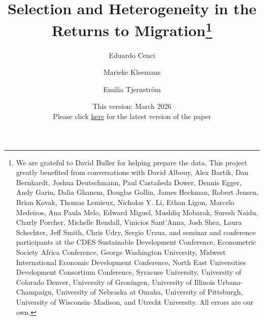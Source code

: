 \documentclass[12pt]{article}
\begin{document}
\hypersetup{pageanchor=false}
\begin{titlepage}

\title{Selection and Heterogeneity in the Returns to Migration\footnote{%
We are grateful to David Buller for helping prepare the data. This project greatly benefited from conversations with David Albouy, Alex Bartik, Dan Bernhardt, Joshua Deutschmann, Paul Castañeda Dower, Dennis Egger, Andy Garin, Dalia Ghanem, Douglas Gollin, James Heckman, Robert Jensen, Brian Kovak, Thomas Lemieux, Nicholas Y. Li, Ethan Ligon, Marcelo Medeiros, Ana Paula Melo, Edward Miguel, Mushfiq Mobarak, Suresh Naidu, Charly Porcher, Michelle Rendall, Vinicios Sant'Anna, Josh Shea, Laura Schechter, Jeff Smith, Chris Udry, Sergio Urzua, and seminar and conference participants at the CDES Sustainable Development Conference, Econometric Society Africa Conference, George Washington University, Midwest International Economic Development Conference, North East Universities Development Consortium Conference, Syracuse University, University of Colorado Denver, University of Groningen, University of Illinois Urbana-Champaign, University of Nebraska at Omaha, University of Pittsburgh, University of Wisconsin–Madison, and Utrecht University. All errors are our own.}}
\author{
  Eduardo Cenci 
  \and
  Marieke Kleemans
  \and
  Emilia Tjernstr\"{o}m
}
{\small \centering \date{This version: March 2026 \\ 
Please click  \href{https://www.econometricsociety.org/event_papers/view/265/450}{here} for the latest version of the paper}}

\clearpage\maketitle
\vspace{-0.4cm}
\thispagestyle{empty}


\end{titlepage}
\end{document}
